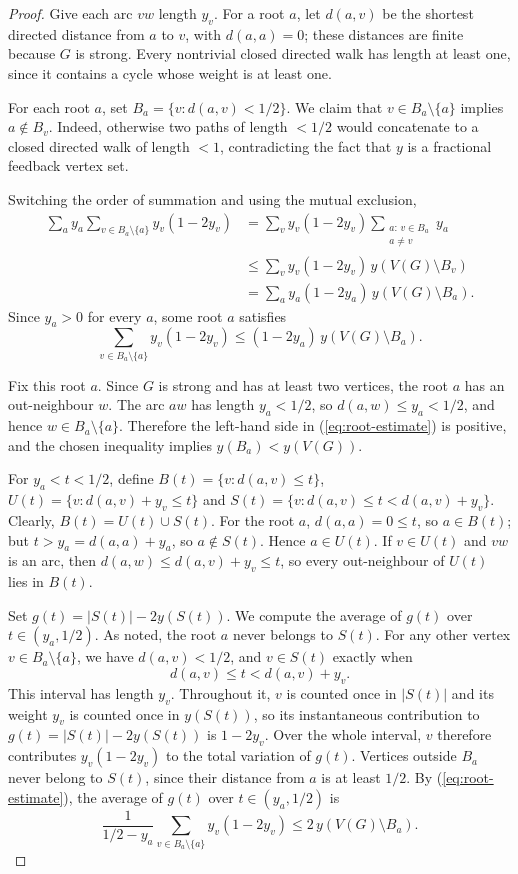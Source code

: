 \documentclass[10pt,a4paper]{article}
\numberwithin{equation}{section}
\newcommand{\jbjcomment}[1]{\textcolor{blue}{JBJ: #1}}
\begin{document}
\begin{proof}
Give each arc $vw$ length $y_v$. For a root $a$, let $d(a,v)$ be the
shortest directed distance from $a$ to $v$, with $d(a,a)=0$; these
distances are finite because $G$ is strong. Every nontrivial closed
directed walk has length at least one, since it contains a cycle whose
weight is at least one.

For each root $a$, set $B_a=\{v:d(a,v)<1/2\}$. We claim that
$v\in B_a\setminus\{a\}$ implies $a\notin B_v$. Indeed, otherwise two
paths of length $<1/2$ would concatenate to a closed directed walk of
length $<1$, contradicting the fact that  $y$ is a fractional feedback vertex set.

Switching the order of summation and using the mutual exclusion,
\begin{align*}
\sum_a y_a\sum_{v\in B_a\setminus\{a\}}y_v(1-2y_v)
&=\sum_v y_v(1-2y_v)\sum_{\substack{a:\,v\in B_a\\a\ne v}}y_a\\
&\le\sum_v y_v(1-2y_v)\,y(V(G)\setminus B_v)\\
&=\sum_a y_a(1-2y_a)\,y(V(G)\setminus B_a).
\end{align*}
Since $y_a>0$ for every $a$, some root $a$ satisfies
\begin{equation}\label{eq:root-estimate}
\sum_{v\in B_a\setminus\{a\}}y_v(1-2y_v)
\le(1-2y_a)\,y(V(G)\setminus B_a).
\end{equation}

Fix this root $a$. Since $G$ is strong and has at least two vertices, the root $a$ has an
out-neighbour $w$. The arc $aw$ has length $y_a<1/2$, so
$d(a,w)\le y_a<1/2$, and hence $w\in B_a\setminus\{a\}$. Therefore the
left-hand side in (\ref{eq:root-estimate}) is positive, and the chosen inequality implies
$y(B_a)<y(V(G))$. %

For $y_a<t<1/2$, define $B(t)=\{v:d(a,v)\le t\}$, $U(t)=\{v:d(a,v)+y_v\le t\}$ and $S(t)=\{v:d(a,v)\le t<d(a,v)+y_v\}$.  Clearly, $B(t)=U(t)\cup S(t)$. 
For the root $a$, $d(a,a)=0\le t$, so $a\in B(t)$; but
$t>y_a=d(a,a)+y_a$, so $a\notin S(t)$. Hence $a\in U(t)$.
 If $v\in U(t)$ and $vw$ is an arc, then
$d(a,w)\le d(a,v)+y_v\le t$, so every out-neighbour of $U(t)$ lies in
$B(t)$.

Set $g(t)=|S(t)|-2y(S(t))$. We compute the average of $g(t)$ over $t\in(y_a,1/2)$. As noted, the
root $a$ never belongs to $S(t)$. For any other vertex
$v\in B_a\setminus\{a\}$, we have $d(a,v)<1/2$, and $v\in S(t)$ exactly
when
$$
d(a,v)\le t<d(a,v)+y_v.
$$
This interval has length $y_v$. Throughout it, $v$ is counted once in
$|S(t)|$ and its weight $y_v$ is counted once in $y(S(t))$, so its
instantaneous contribution to $g(t)=|S(t)|-2y(S(t))$ is $1-2y_v$.
Over the whole interval, $v$ therefore contributes
$y_v(1-2y_v)$ to the total variation of $g(t)$. Vertices outside $B_a$
never belong to $S(t)$, since their distance from $a$ is at least $1/2$.
By (\ref{eq:root-estimate}), the average of $g(t)$ over $t\in(y_a,1/2)$ is
$$
\frac{1}{1/2-y_a}\sum_{v\in B_a\setminus\{a\}}y_v(1-2y_v)
\le 2\,y(V(G)\setminus B_a).
$$


\end{proof}
\end{document}
